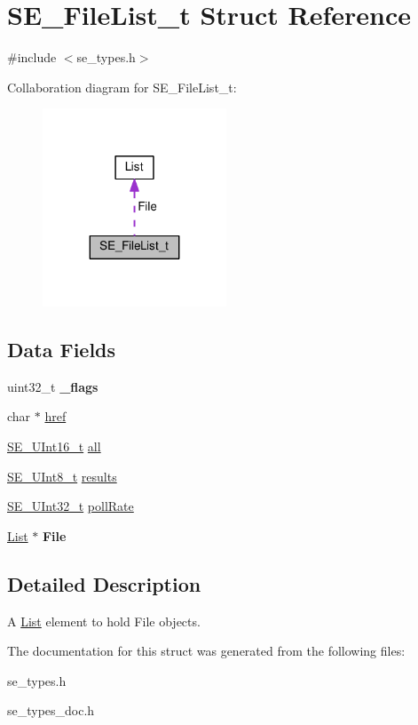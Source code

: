 \hypertarget{structSE__FileList__t}{}\section{S\+E\+\_\+\+File\+List\+\_\+t Struct Reference}
\label{structSE__FileList__t}


{\ttfamily \#include $<$se\+\_\+types.\+h$>$}



Collaboration diagram for S\+E\+\_\+\+File\+List\+\_\+t\+:\nopagebreak
\begin{figure}[H]
\begin{center}
\leavevmode
\includegraphics[width=155pt]{structSE__FileList__t__coll__graph}
\end{center}
\end{figure}
\subsection*{Data Fields}
\begin{DoxyCompactItemize}
\item 
uint32\+\_\+t {\bfseries \+\_\+flags}
\item 
char $\ast$ \hyperlink{group__FileList_ga7ddecb44b6b65daa5a5324c09a396853}{href}
\item 
\hyperlink{group__UInt16_gac68d541f189538bfd30cfaa712d20d29}{S\+E\+\_\+\+U\+Int16\+\_\+t} \hyperlink{group__FileList_ga3c96b7591e75f2ba60753bd7e7b706e5}{all}
\item 
\hyperlink{group__UInt8_gaf7c365a1acfe204e3a67c16ed44572f5}{S\+E\+\_\+\+U\+Int8\+\_\+t} \hyperlink{group__FileList_gaac837f0b9ccb09e669a79138ff5fc4b4}{results}
\item 
\hyperlink{group__UInt32_ga70bd4ecda3c0c85d20779d685a270cdb}{S\+E\+\_\+\+U\+Int32\+\_\+t} \hyperlink{group__FileList_ga27aa967b9be8765b2407b51ba6e3e65e}{poll\+Rate}
\item 
\hyperlink{structList}{List} $\ast$ {\bfseries File}
\end{DoxyCompactItemize}


\subsection{Detailed Description}
A \hyperlink{structList}{List} element to hold File objects. 

The documentation for this struct was generated from the following files\+:\begin{DoxyCompactItemize}
\item 
se\+\_\+types.\+h\item 
se\+\_\+types\+\_\+doc.\+h\end{DoxyCompactItemize}
